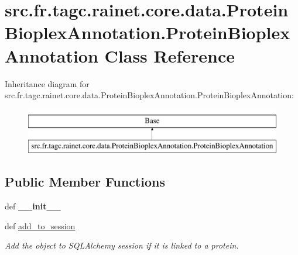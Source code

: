 \hypertarget{classsrc_1_1fr_1_1tagc_1_1rainet_1_1core_1_1data_1_1ProteinBioplexAnnotation_1_1ProteinBioplexAnnotation}{\section{src.\-fr.\-tagc.\-rainet.\-core.\-data.\-Protein\-Bioplex\-Annotation.\-Protein\-Bioplex\-Annotation Class Reference}
\label{classsrc_1_1fr_1_1tagc_1_1rainet_1_1core_1_1data_1_1ProteinBioplexAnnotation_1_1ProteinBioplexAnnotation}
}
Inheritance diagram for src.\-fr.\-tagc.\-rainet.\-core.\-data.\-Protein\-Bioplex\-Annotation.\-Protein\-Bioplex\-Annotation\-:\begin{figure}[H]
\begin{center}
\leavevmode
\includegraphics[height=2.000000cm]{classsrc_1_1fr_1_1tagc_1_1rainet_1_1core_1_1data_1_1ProteinBioplexAnnotation_1_1ProteinBioplexAnnotation}
\end{center}
\end{figure}
\subsection*{Public Member Functions}
\begin{DoxyCompactItemize}
\item 
\hypertarget{classsrc_1_1fr_1_1tagc_1_1rainet_1_1core_1_1data_1_1ProteinBioplexAnnotation_1_1ProteinBioplexAnnotation_abb77373de7dfea06f4e0a64cfb428677}{def {\bfseries \-\_\-\-\_\-init\-\_\-\-\_\-}}\label{classsrc_1_1fr_1_1tagc_1_1rainet_1_1core_1_1data_1_1ProteinBioplexAnnotation_1_1ProteinBioplexAnnotation_abb77373de7dfea06f4e0a64cfb428677}

\item 
\hypertarget{classsrc_1_1fr_1_1tagc_1_1rainet_1_1core_1_1data_1_1ProteinBioplexAnnotation_1_1ProteinBioplexAnnotation_abb3a45942a65f0e37ddee515a8cb0c6d}{def \hyperlink{classsrc_1_1fr_1_1tagc_1_1rainet_1_1core_1_1data_1_1ProteinBioplexAnnotation_1_1ProteinBioplexAnnotation_abb3a45942a65f0e37ddee515a8cb0c6d}{add\-\_\-to\-\_\-session}}\label{classsrc_1_1fr_1_1tagc_1_1rainet_1_1core_1_1data_1_1ProteinBioplexAnnotation_1_1ProteinBioplexAnnotation_abb3a45942a65f0e37ddee515a8cb0c6d}

\begin{DoxyCompactList}\small\item\em Add the object to S\-Q\-L\-Alchemy session if it is linked to a protein. \end{DoxyCompactList}\end{DoxyCompactItemize}

